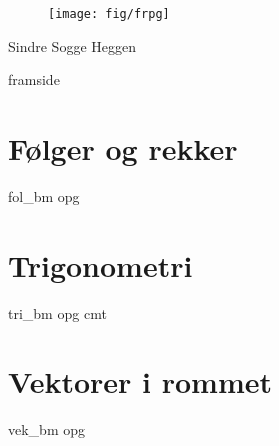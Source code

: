 



\addto\captionsenglish{\renewcommand{\figurename}{Figur}}
\makeatletter
\addto\captionsenglish{\renewcommand{\chaptername}{Kapittel}}
\addto\captionsenglish{\renewcommand{\contentsname}{Innhold}}



	
	\pagecolor{blue!20}
	
	\begin{titlepage}
		\begin{center}
			\vspace*{1cm}
			
			{}
			
			\vspace{2.45cm} 
			\begin{figure}[H]
				\centering
				\qquad\texttt{[image: fig/frpg]}
			\end{figure}           
			\vspace{2 cm}
			\raggedleft Sindre Sogge Heggen   \end{center}
	\end{titlepage}
	\pagecolor{white}
\newpage
\phantom{}
\thispagestyle{empty}	
\newpage	
{framside}
\newpage

\footnotesize
\tableofcontents
\normalsize
\chapter{Følger og rekker\label{Folgerogrekker}}
\vspace{20pt}
{fol_bm}
\newpage
{opg}

\chapter{Trigonometri\label{Trigonometri}}
\vspace{20pt}
{tri_bm}
\newpage
{opg}
\newpage
{cmt}

\chapter{Vektorer i rommet\label{Vektorerirommet}}
\vspace{20pt}
{vek_bm}
\newpage
{opg}

